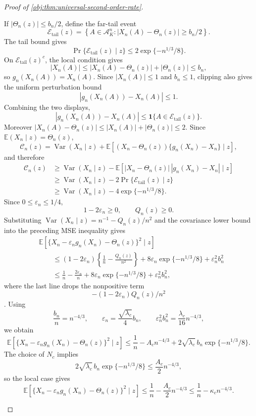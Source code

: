 \documentclass[11pt]{article}
\begin{document}
\begin{proof}[Proof of \cref{obj:thm:universal-second-order-rate}]
\begin{enumerate}
If \(|\Theta_n(z)|\le b_n/2\), define the far-tail event
\[
\mathscr E_{\mathrm{tail}}(z)
=
\left\{A\in\mathcal A_K^n:
|X_n(A)-\Theta_n(z)|\ge b_n/2\right\}.
\]
The tail bound gives
\[
\Pr\{\mathscr E_{\mathrm{tail}}(z)\mid z\}
\le 2\exp\{-n^{1/3}/8\}.
\]
On \(\mathscr E_{\mathrm{tail}}(z)^c\), the local condition gives
\[
|X_n(A)|
\le |X_n(A)-\Theta_n(z)|+|\Theta_n(z)|
\le b_n,
\]
so \(g_n(X_n(A))=X_n(A)\). Since \(|X_n(A)|\le1\) and \(b_n\le1\), clipping also gives the uniform perturbation bound
\[
|g_n(X_n(A))-X_n(A)|\le 1.
\]
Combining the two displays,
\[
|g_n(X_n(A))-X_n(A)|
\le \mathbf 1\{A\in\mathscr E_{\mathrm{tail}}(z)\}.
\]
Moreover \(|X_n(A)-\Theta_n(z)|\le |X_n(A)|+|\Theta_n(z)|\le2\). Since \(\mathbb E(X_n\mid z)=\Theta_n(z)\),
\[
\mathcal C_n(z)
=
\operatorname{Var}(X_n\mid z)
+\mathbb E\!\left[(X_n-\Theta_n(z))\{g_n(X_n)-X_n\}\mid z\right],
\]
and therefore
\[
\begin{aligned}
\mathcal C_n(z)
&\ge \operatorname{Var}(X_n\mid z)
-\mathbb E\!\left[|X_n-\Theta_n(z)|\,|g_n(X_n)-X_n|\mid z\right]\\
&\ge \operatorname{Var}(X_n\mid z)-2\Pr\{\mathscr E_{\mathrm{tail}}(z)\mid z\}\\
&\ge \operatorname{Var}(X_n\mid z)-4\exp\{-n^{1/3}/8\}.
\end{aligned}
\]
Since \(0\le\varepsilon_n\le1/4\),
\[
1-2\varepsilon_n\ge0,
\qquad
Q_n(z)\ge0.
\]
Substituting \(\operatorname{Var}(X_n\mid z)=n^{-1}-Q_n(z)/n^2\) and the covariance lower bound into the preceding MSE inequality gives
\[
\begin{aligned}
&\mathbb E\!\left[\{X_n-\varepsilon_n g_n(X_n)-\Theta_n(z)\}^2\mid z\right] \\
&\qquad\le
\left(1-2\varepsilon_n\right)
\left\{\frac1n-\frac{Q_n(z)}{n^2}\right\}
+8\varepsilon_n\exp\{-n^{1/3}/8\}
+\varepsilon_n^2b_n^2 \\
&\qquad\le
\frac1n-\frac{2\varepsilon_n}{n}
+8\varepsilon_n\exp\{-n^{1/3}/8\}
+\varepsilon_n^2b_n^2,
\end{aligned}
\]
where the last line drops the nonpositive term
\[-(1-2\varepsilon_n)Q_n(z)/n^2\]. Using
\[
\frac{b_n}{n}=n^{-4/3},
\qquad
\varepsilon_n=\frac{\sqrt{\lambda_c}}4 b_n,
\qquad
\varepsilon_n^2b_n^2
=
\frac{\lambda_c}{16}n^{-4/3},
\]
we obtain
\[
\mathbb E\!\left[\{X_n-\varepsilon_n g_n(X_n)-\Theta_n(z)\}^2\mid z\right]
\le
\frac1n-A_c n^{-4/3}
+2\sqrt{\lambda_c}\,b_n\exp\{-n^{1/3}/8\}.
\]
The choice of \(N_c\) implies
\[
2\sqrt{\lambda_c}\,b_n\exp\{-n^{1/3}/8\}
\le
\frac{A_c}{2}n^{-4/3},
\]
so the local case gives
\[
\mathbb E\!\left[\{X_n-\varepsilon_n g_n(X_n)-\Theta_n(z)\}^2\mid z\right]
\le
\frac1n-\frac{A_c}{2}n^{-4/3}
\le
\frac1n-\kappa_c n^{-4/3}.
\]


\end{enumerate}
\end{proof}
\end{document}
